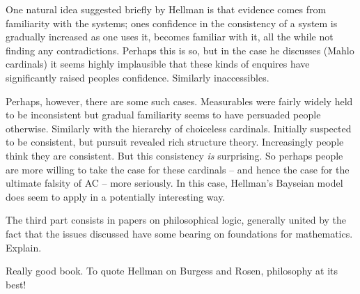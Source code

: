 \documentclass{asl}
\theoremstyle{definition}
\begin{document}
One natural idea suggested briefly by Hellman is that evidence comes from 
familiarity with the systems; ones confidence in the consistency of a system 
is gradually increased as one uses it, becomes familiar with it, all the while 
not finding any contradictions. Perhaps this is so, but in the case he discusses 
(Mahlo cardinals) it seems highly implausible that these kinds of enquires have 
significantly raised peoples confidence. Similarly inaccessibles.

Perhaps, however, there are some such cases. 
Measurables were fairly widely held to be inconsistent but gradual 
familiarity seems to have persuaded people otherwise. Similarly with the 
hierarchy of choiceless cardinals. Initially suspected to be consistent, 
but pursuit revealed rich structure theory. Increasingly people think they 
are consistent. But this consistency \emph{is} surprising. So perhaps people 
are more willing to take the case for these cardinals -- and hence the case 
for the ultimate falsity of AC -- more seriously. In this case, Hellman's 
Bayseian model does seem to apply in a potentially interesting way.



The third part consists in papers on philosophical logic, generally united by the fact that the issues discussed have some bearing on foundations for mathematics. Explain.

Really good book. To quote Hellman on Burgess and Rosen, philosophy at its best!



%
\end{document}
